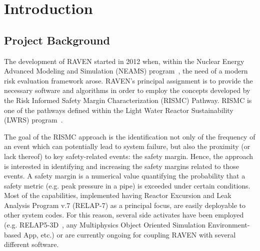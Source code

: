 \section{Introduction}

\subsection{Project Background}
The development of RAVEN started in 2012 when, within the Nuclear Energy
Advanced Modeling and Simulation (NEAMS) program~\cite{neams}, the need of a modern
risk evaluation framework arose.
RAVEN's principal assignment is to provide the necessary software and algorithms
in order to employ the concepts developed by the Risk Informed Safety Margin
Characterization (RISMC) Pathway.
RISMC is one of the pathways defined within the Light Water Reactor
Sustainability (LWRS) program~\cite{lwrs}.

The goal of the RISMC approach is  the identification not only of the frequency of an
event which can potentially lead to system failure, but also the proximity (or lack
thereof) to key safety-related events: the safety margin.
Hence, the approach is interested in identifying and increasing the safety
margins related to those events.
A safety margin is a numerical value quantifying the probability that a safety
metric (e.g. peak pressure in a pipe) is exceeded under certain conditions.
Most of the capabilities, implemented having Reactor Excursion and Leak Analysis Program v.7
(RELAP-7) as a principal focus, are
easily deployable to other system codes.
%
For this reason, several side activates have been employed (e.g.  RELAP5-3D~\cite{RELAP5userManual}, any Multiphysics Object Oriented
Simulation Environment-based App, etc.)
or are currently ongoing for coupling RAVEN with several different software.
%

